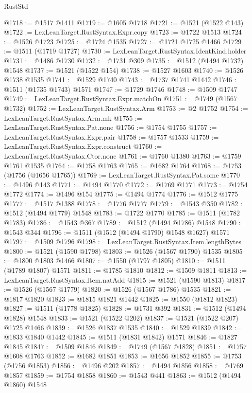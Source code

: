 \begin{lexlean}{RustStd}
\begin{coremodule}
{\begin{coremodule}
{{{{{{{{{{{{{{{{{{{{{{{{{{{{{{{{{{{@1718 := @1517 @1411
@1719 := @1605 @1718
@1721 := @1521 (@1522 @143)
@1722 := LexLeanTarget.RustSyntax.Expr.copy
@1723 := @1722 @1513
@1724 := @1526 @1723
@1725 := @1724 @1535
@1727 := @1721 @1725 @1466
@1729 := @1511 (@1719 @1727)
@1730 := LexLeanTarget.RustSyntax.IdentKind.holder
@1731 := @1486 @1730
@1732 := @1731 @309
@1735 := @1512 (@1494 @1732) @1548
@1737 := @1521 (@1522 @154)
@1738 := @1527 @1603
@1740 := @1526 @1738 @1535
@1741 := @1529 @1740
@1743 := @1737 @1741 @1442
@1746 := @1511 (@1735 @1743) @1571
@1747 := @1729 @1746
@1748 := @1509 @1747
@1749 := LexLeanTarget.RustSyntax.Expr.matchOn
@1751 := @1749 (@1567 @1732)
@1752 := LexLeanTarget.RustSyntax.Arm
@1753 := @2 @1752
@1754 := LexLeanTarget.RustSyntax.Arm.mk
@1755 := LexLeanTarget.RustSyntax.Pat.none
@1756 := @1754 @1755
@1757 := LexLeanTarget.RustSyntax.Expr.pair
@1758 := @1757 @1533
@1759 := LexLeanTarget.RustSyntax.Expr.construct
@1760 := LexLeanTarget.RustSyntax.Ctor.none
@1761 := @1760 @1380
@1763 := @1759 @1761 @1535
@1764 := @1758 @1763
@1765 := @1682 @1764
@1768 := @1753 (@1756 (@1656 @1765))
@1769 := LexLeanTarget.RustSyntax.Pat.some
@1770 := @1496 @143
@1771 := @1494 @1770
@1772 := @1769 @1771
@1773 := @1754 @1772
@1774 := @1496 @154
@1775 := @1494 @1774
@1776 := @1512 @1775
@1777 := @1517 @1388
@1778 := @1776 @1777
@1779 := @1543 @350
@1782 := @1512 (@1494 @1779) @1548
@1783 := @1722 @1770
@1785 := @1511 (@1782 @1783)
@1786 := @1543 @367
@1789 := @1512 (@1494 @1786) @1548
@1790 := @1543 @344
@1796 := @1511 (@1512 (@1494 @1790) @1548 @1627) @1571
@1797 := @1509 @1796
@1798 := LexLeanTarget.RustSyntax.Item.lengthBytes
@1800 := @1521 (@1590 @1798)
@1803 := @1526 (@1567 @1790) @1535
@1805 := @1800 @1803 @1466
@1807 := @1550 (@1797 @1805)
@1810 := @1511 (@1789 @1807) @1571
@1811 := @1785 @1810
@1812 := @1509 @1811
@1813 := LexLeanTarget.RustSyntax.Item.natAdd
@1815 := @1521 (@1590 @1813)
@1817 := @1526 (@1567 @1779)
@1820 := @1526 (@1567 @1786) @1535
@1821 := @1817 @1820
@1823 := @1815 @1821 @1442
@1825 := @1550 (@1812 @1823)
@1827 := @1511 (@1778 @1825)
@1828 := @1731 @392
@1831 := @1512 (@1494 @1828) @1548
@1833 := @1521 (@1522 @202)
@1837 := @1521 (@1522 @207) @1725 @1466
@1839 := @1526 @1837 @1535
@1840 := @1529 @1839
@1842 := @1833 @1840 @1442
@1845 := @1511 (@1831 @1842) @1571
@1846 := @1827 @1845
@1847 := @1509 @1846
@1849 := @1749 (@1567 @1828)
@1851 := @1757 @1608 @1763
@1852 := @1682 @1851
@1853 := @1656 @1852
@1855 := @1753 (@1756 @1853)
@1856 := @1496 @202
@1857 := @1494 @1856
@1858 := @1769 @1857
@1859 := @1754 @1858
@1860 := @1543 @441
@1863 := @1512 (@1494 @1860) @1548
}}}}}}}}}}}}}}}}}}}}}}}}}}}}}}}}}}}
\end{coremodule}}
\end{coremodule}
\end{lexlean}
